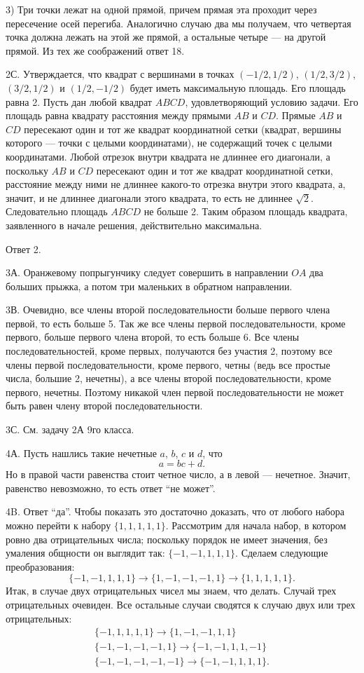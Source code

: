 \documentclass[12pt]{amsart}
\theoremstyle{definition}
\theoremstyle{remark}
\theoremstyle{plain}
\begin{document}
3) Три точки лежат на одной прямой, причем прямая эта проходит через пересечение осей перегиба. Аналогично случаю два мы получаем, что четвертая точка должна лежать на этой же прямой, а остальные четыре --- на другой прямой. Из тех же соображений ответ 18.

2С. Утверждается, что квадрат с вершинами в точках $(-1/2,1/2)$, $(1/2,3/2)$, $(3/2,1/2)$ и $(1/2,-1/2)$ будет иметь максимальную площадь. Его площадь равна 2. Пусть дан любой квадрат $ABCD$, удовлетворяющий условию задачи. Его площадь равна квадрату расстояния между прямыми $AB$ и $CD$. Прямые $AB$ и $CD$ пересекают один и тот же квадрат координатной сетки (квадрат, вершины которого --- точки с целыми координатами), не содержащий точек с целыми координатами. Любой отрезок внутри квадрата не длиннее его диагонали, а поскольку $AB$ и $CD$ пересекают один и тот же квадрат координатной сетки, расстояние между ними не длиннее какого-то отрезка внутри этого квадрата, а, значит, и не длиннее диагонали этого квадрата, то есть не длиннее $\sqrt{2}$. Следовательно площадь $ABCD$ не больше 2. Таким образом площадь квадрата, заявленного в начале решения, действительно максимальна.

Ответ 2.

3А. Оранжевому попрыгунчику следует совершить в направлении $OA$ два больших прыжка, а потом три маленьких в обратном направлении.

3В. Очевидно, все члены второй последовательности больше первого члена первой, то есть больше 5. Так же все члены первой последовательности, кроме первого, больше первого члена второй, то есть больше 6. Все члены последовательностей, кроме первых, получаются без участия 2, поэтому все члены первой последовательности, кроме первого, четны (ведь все простые числа, большие 2, нечетны), а все члены второй последовательности, кроме первого, нечетны. Поэтому никакой член первой последовательности не может быть равен члену второй последовательности.

3С. См. задачу 2А 9го класса.

4А. Пусть нашлись такие нечетные $a$, $b$, $c$ и $d$, что
$$
a=bc+d.
$$
Но в правой части равенства стоит четное число, а в левой --- нечетное. Значит, равенство невозможно, то есть ответ "`не может"'.

4B. Ответ "`да"'. Чтобы показать это достаточно доказать, что от любого набора можно перейти к набору $\{1,1,1,1,1\}$. Рассмотрим для начала набор, в котором ровно два отрицательных числа; поскольку порядок не имеет значения, без умаления общности он выглядит так: $\{-1,-1,1,1,1\}$. Сделаем следующие преобразования:
$$
\{-1,-1,1,1,1\}\to \{1,-1,-1,-1,1\}\to \{1,1,1,1,1\}.
$$
Итак, в случае двух отрицательных чисел мы знаем, что делать. Случай трех отрицательных очевиден. Все остальные случаи сводятся к случаю двух или трех отрицательных:
$$\begin{array}{l}
\{-1,1,1,1,1\}\to \{1,-1,-1,1,1\} \\
\{-1,-1,-1,-1,1\}\to \{-1,-1,1,1,-1\} \\
\{-1,-1,-1,-1,-1\}\to  \{-1,-1,1,1,1\}.
\end{array}$$
\end{document}

